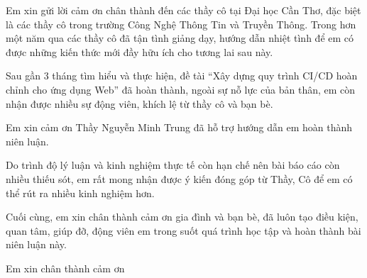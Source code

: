 \documentclass[12pt,a4paper,oneside]{extreport}
\begin{document}
\ctumakecover
\ctumakeinnertitle

\ctufrontmatter

Em xin gửi lời cảm ơn chân thành đến các thầy cô tại Đại học Cần Thơ, đặc biệt
là các thầy cô trong trường Công Nghệ Thông Tin và Truyền Thông. Trong hơn một
năm qua các thầy cô đã tận tình giảng dạy, hướng dẫn nhiệt tình để em có được
những kiến thức mới đầy hữu ích cho tương lai sau này.

Sau gần 3 tháng tìm hiểu và thực hiện, đề tài ``Xây dựng quy trình CI/CD hoàn
chỉnh cho ứng dụng Web'' đã hoàn thành, ngoài sự nỗ lực của bản thân, em còn
nhận được nhiều sự động viên, khích lệ từ thầy cô và bạn bè.

Em xin cảm ơn Thầy Nguyễn Minh Trung đã hỗ trợ hướng dẫn em hoàn thành niên
luận.

Do trình độ lý luận và kinh nghiệm thực tế còn hạn chế nên bài báo cáo còn
nhiều thiếu sót, em rất mong nhận được ý kiến đóng góp từ Thầy, Cô để em có thể
rút ra nhiều kinh nghiệm hơn.

Cuối cùng, em xin chân thành cảm ơn gia đình và bạn bè, đã luôn tạo điều kiện,
quan tâm, giúp đỡ, động viên em trong suốt quá trình học tập và hoàn thành bài
niên luận này.

\begin{flushright}
  Em xin chân thành cảm ơn
\end{flushright}

\ctutableofcontents
\ctulistoffigures
\ctulistoftables
\end{document}
